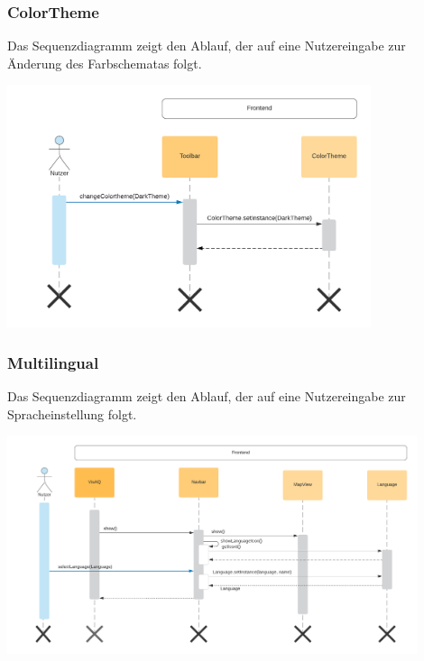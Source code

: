 \subsubsection{ColorTheme}
\label{Screenshots}
Das Sequenzdiagramm zeigt den Ablauf, der auf eine Nutzereingabe zur Änderung des Farbschematas folgt.
\begin{center}
	\includegraphics[width=0.8\textwidth]{media/frontend/sequence-diagram/sequenceColorTheme.png} 
\end{center}
\clearpage %
\subsubsection{Multilingual}
\label{Screenshots}
Das Sequenzdiagramm zeigt den Ablauf, der auf eine Nutzereingabe zur Spracheinstellung folgt.
\begin{center}
	\includegraphics[width=0.9\textwidth]{media/frontend/sequence-diagram/sequenceMultilingual.png} 
\end{center}

\clearpage %
